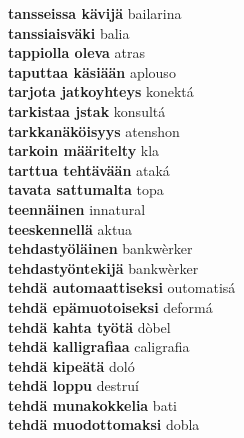 \textbf{ tansseissa kävijä  } bailarina \\
\textbf{ tanssiaisväki  } balia \\
\textbf{ tappiolla oleva  } atras \\
\textbf{ taputtaa käsiään  } aplouso \\
\textbf{ tarjota jatkoyhteys  } konektá \\
\textbf{ tarkistaa jstak  } konsultá \\
\textbf{ tarkkanäköisyys  } atenshon \\
\textbf{ tarkoin määritelty  } kla \\
\textbf{ tarttua tehtävään  } ataká \\
\textbf{ tavata sattumalta  } topa \\
\textbf{ teennäinen  } innatural \\
\textbf{ teeskennellä  } aktua \\
\textbf{ tehdastyöläinen  } bankwèrker \\
\textbf{ tehdastyöntekijä  } bankwèrker \\
\textbf{ tehdä automaattiseksi  } outomatisá \\
\textbf{ tehdä epämuotoiseksi  } deformá \\
\textbf{ tehdä kahta työtä  } dòbel \\
\textbf{ tehdä kalligrafiaa  } caligrafia \\
\textbf{ tehdä kipeätä  } doló \\
\textbf{ tehdä loppu  } destruí \\
\textbf{ tehdä munakokkelia  } bati \\
\textbf{ tehdä muodottomaksi  } dobla \\
